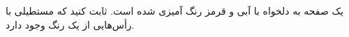 \EXERCISE
يک صفحه به دلخواه با آبی و قرمز رنگ آميزی شده است. ثابت کنيد که مستطيلی با رأس‌هايی از يک رنگ وجود دارد.